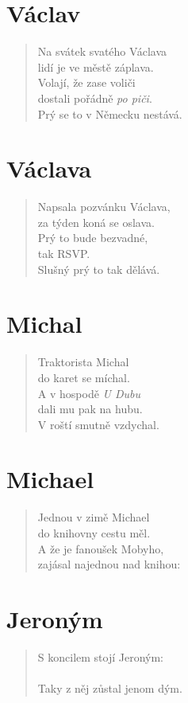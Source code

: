 \section*{Václav}
\begin{verse}
Na svátek svatého Václava\\
lidí je ve městě záplava.\\
Volají, že zase voliči\\
dostali pořádně \textit{po piči}.\\
Prý se to v Německu nestává.
\end{verse}

\section*{Václava}
\begin{verse}
Napsala pozvánku Václava,\\
za týden koná se oslava.\\
Prý to bude bezvadné,\\
tak RSVP.\\
Slušný prý to tak dělává.
\end{verse}

\section*{Michal}
\begin{verse}
Traktorista Michal\\
do karet se míchal.\\
A v hospodě \textit{U Dubu}\\
dali mu pak na hubu.\\
V roští smutně vzdychal.
\end{verse}

\section*{Michael}
\begin{verse}
Jednou v zimě Michael\\
do knihovny cestu měl.\\
A že je fanoušek Mobyho,\\
zajásal najednou nad knihou:\\
\end{verse}

\section*{Jeroným}
\begin{verse}
S koncilem stojí Jeroným:\\
\\
Taky z něj zůstal jenom dým.
\end{verse}

